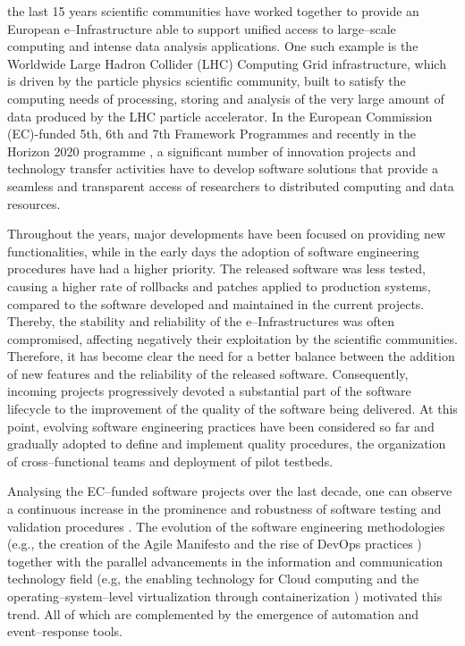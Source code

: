\documentclass[journal]{IEEEtran}
\begin{document}
 the last 15 years scientific communities have worked together to provide an European e--Infrastructure
able to support unified access to large--scale computing and intense data analysis
applications.
One such example is the Worldwide
Large Hadron Collider (LHC) Computing Grid infrastructure, which is driven
by the particle physics scientific community, built to satisfy the computing needs
of processing, storing and analysis of the very large amount of data produced by the
LHC particle accelerator. 
In the European Commission
(EC)-funded 5th, 6th and 7th Framework Programmes and recently in the Horizon 2020 programme
\cite{h2020}, a significant number of innovation projects and technology transfer
activities have to develop software solutions that provide a seamless and
transparent access of researchers to distributed computing and data resources.

Throughout the years, major developments have been focused on providing new
functionalities, while in the early days the adoption of software engineering procedures have had a higher priority.
The released software was less tested, causing a higher rate of
rollbacks and patches applied to production systems, compared to the software developed and maintained in the current projects. Thereby, the stability and
reliability of the e--Infrastructures was often compromised, affecting
negatively their exploitation by the scientific communities.
Therefore, it has become clear the need for a better balance between the addition of new features
and the reliability of the released software. Consequently, incoming projects progressively
devoted a substantial part of the software lifecycle to the improvement of the quality of the
software being delivered. At this point, evolving software engineering practices have been considered
so far and gradually adopted to define and implement quality procedures, the organization of
cross--functional teams and deployment of pilot testbeds.

Analysing the EC--funded software projects over the last decade,
one can observe a continuous increase in the prominence and robustness of software
testing and validation procedures \cite{aiftimiei}. The
evolution of the software engineering methodologies (e.g., the creation of the Agile
Manifesto \cite{agile-manifesto} and the rise of DevOps practices \cite{zhu}) together
with the parallel advancements in the information and communication technology
field (e.g, the enabling technology for Cloud computing and the
operating--system--level virtualization through containerization \cite{soltesz}) motivated this trend. All of which
are complemented by the emergence of automation and event--response tools.
\end{document}
